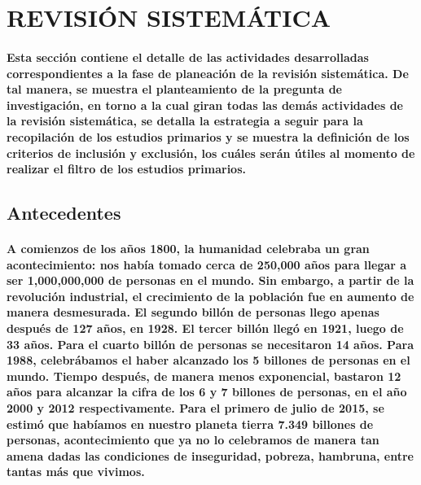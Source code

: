 \documentclass[10pt, twocolumn]{article}
\begin{document}

\section{REVISIÓN SISTEMÁTICA}
\paragraph{Esta sección contiene el detalle de las actividades desarrolladas correspondientes a la fase de planeación de la revisión sistemática. De tal manera, se muestra el planteamiento de la pregunta de investigación, en torno a la cual giran todas las demás actividades de la revisión sistemática, se detalla la estrategia a seguir para la recopilación de los estudios primarios y se muestra la definición de los criterios de inclusión y exclusión, los cuáles serán útiles al momento de realizar el filtro de los estudios primarios.}

\subsection{Antecedentes}
\paragraph{A comienzos de los años 1800, la humanidad celebraba un gran acontecimiento: nos había tomado cerca de 250,000 años para llegar a ser 1,000,000,000 de personas en el mundo. Sin embargo, a partir de la revolución industrial, el crecimiento de la población fue en aumento de manera desmesurada. El segundo billón de personas llego apenas después de 127 años, en 1928. El tercer billón llegó en 1921, luego de 33 años. Para el cuarto billón de personas se necesitaron 14 años. Para 1988, celebrábamos el haber alcanzado los 5 billones de personas en el mundo. Tiempo después, de manera menos exponencial, bastaron 12 años para alcanzar la cifra de los 6 y 7 billones de personas, en el año 2000 y 2012 respectivamente. Para el primero de julio de 2015, se estimó que habíamos en nuestro planeta tierra 7.349 billones de personas, acontecimiento que ya no lo celebramos de manera tan amena dadas las condiciones de inseguridad, pobreza, hambruna, entre tantas más que vivimos.}
\end{document}

